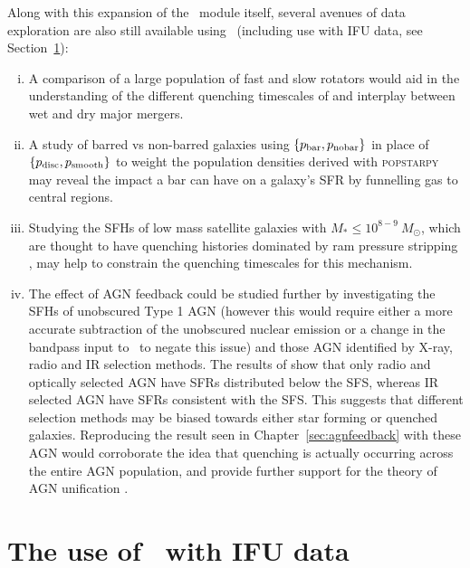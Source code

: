 Along with this expansion of the \starpy\ module itself, several avenues of data exploration are also still available using \starpy\ (including use with IFU data, see Section~\ref{sec:IFU}):
\begin{enumerate}[(i)]

\item A comparison of a large population of fast and slow rotators would aid in the understanding of the different quenching timescales of and interplay between wet and dry major mergers. 

\item A study of barred vs non-barred galaxies using $\{p_{\rm{bar}}, p_{\rm{no bar}}\}$ in place of $\{p_{\rm{disc}}, p_{\rm{smooth}}\}$ to weight the population densities derived with \textsc{popstarpy} may reveal the impact a bar can have on a galaxy's SFR by funnelling gas to central regions.

\item Studying the SFHs of low mass satellite galaxies with $M_* \leq 10^{8-9} ~M_{\odot}$, which are thought to have quenching histories dominated by ram pressure stripping \citep{hester06, fillingham16}, may help to constrain the quenching timescales for this mechanism. 

\item The effect of AGN feedback could be studied further by investigating the SFHs of unobscured Type 1 AGN (however this would require either a more accurate subtraction of the unobscured nuclear emission or a change in the bandpass input to \starpy\ to negate this issue) and those AGN identified by X-ray, radio and IR selection methods.  The results of \citep{ellison16} show that only radio and optically selected AGN have SFRs distributed below the SFS, whereas IR selected AGN have SFRs consistent with the SFS. This suggests that different selection methods may be biased towards either star forming or quenched galaxies. Reproducing the result seen in Chapter~\ref{sec:agnfeedback} with these AGN would corroborate the idea that quenching is actually occurring across the entire AGN population, and provide further support for the theory of AGN unification \citep{antonucci93, urry95}.

\end{enumerate}

\section{The use of \starpy\ with IFU data}\label{sec:IFU}

